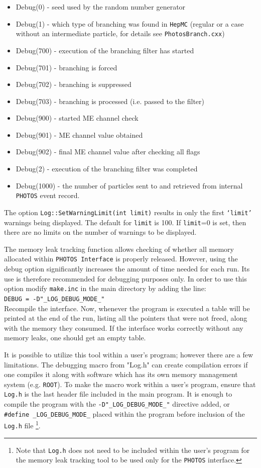 \documentclass[]{Photos_interface_design}
\begin{document}
\begin{itemize}
  \item Debug(0)    - seed used by the random number generator
  \item Debug(1)    - which type of branching was found in {\tt HepMC}
                     (regular or a case without an intermediate particle, for details see {\tt PhotosBranch.cxx})
  \item Debug(700)  - execution of the branching filter has started
  \item Debug(701)  - branching is forced
  \item Debug(702)  - branching is suppressed
  \item Debug(703)  - branching is processed (i.e. passed to the filter)
  \item Debug(900)  - started ME channel check
  \item Debug(901)  - ME channel value obtained
  \item Debug(902)  - final ME channel value after checking all flags
  \item Debug(2)    - execution of the branching filter was completed
  \item Debug(1000) - the number of particles sent to and retrieved from internal {\tt PHOTOS} event record.
\end{itemize}
 
The option {\tt Log::SetWarningLimit(int limit)} results in 
only the first {\tt `limit'} warnings being displayed. The default for {\tt limit} is 100. 
If {\tt limit}=0 is set, then there are no limits on the number of warnings to be displayed.

The memory leak tracking function allows checking of whether all memory allocated within {\tt PHOTOS Interface}
 is properly released. However, using the debug option significantly increases the amount of time needed for 
each run. Its  use is therefore recommended  for debugging purposes only. In order to use this option
 modify {\tt make.inc} in the main directory by adding the line: \\ 
 {\tt DEBUG = -D"\_LOG\_DEBUG\_MODE\_" } \\ 
Recompile the interface.
Now, whenever the program is executed a table will be printed at the end of the run,
listing all the pointers that were not freed, along with the memory they consumed.
If the interface works correctly without any memory leaks, one should get an empty table.

It is possible to utilize this tool within a user's program; however there are a few limitations.
The debugging macro from "Log.h" can create compilation errors if one compiles
it along with software which has its own memory management system (e.g. {\tt ROOT}).
To make the macro work within a user's program, ensure that {\tt Log.h} is the last header file
included in the main program.
It is enough to  compile the program with the {\tt -D"\_LOG\_DEBUG\_MODE\_"} directive added,
or {\tt \#define \_LOG\_DEBUG\_MODE\_} placed within the program before inclusion of
 the {\tt Log.h} file%
\footnote{Note that {\tt Log.h} does not need to be included within
the user's program  for the memory leak tracking tool to be used only for the {\tt PHOTOS} interface.
}.
\end{document}
